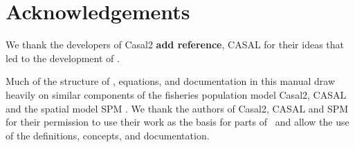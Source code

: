 \section{Acknowledgements\label{sec:acknowledgements}}

We thank the developers of Casal2 \textbf{add reference}, CASAL \citep{1388} for their ideas that led to the development of \IBM. 

Much of the structure of \IBM, equations, and documentation in this manual draw heavily on similar components of the fisheries population model Casal2, CASAL \citep{1388} and  the spatial model SPM \citep{SPM}. We thank the authors of Casal2, CASAL and SPM for their permission to use their work as the basis for parts of \IBM\ and allow the use of the definitions, concepts, and documentation. 

